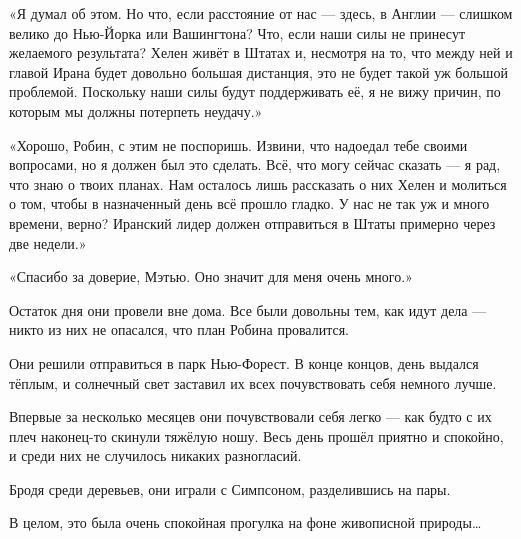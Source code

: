 \documentclass[a4paper,12pt]{book}
\begin{document}
«Я думал об этом. Но что, если расстояние от нас — здесь, в Англии — слишком велико до Нью-Йорка или Вашингтона? Что, если наши силы не принесут желаемого результата? Хелен живёт в Штатах и, несмотря на то, что между ней и главой Ирана будет довольно большая дистанция, это не будет такой уж большой проблемой. Поскольку наши силы будут поддерживать её, я не вижу причин, по которым мы должны потерпеть неудачу.»
\par
«Хорошо, Робин, с этим не поспоришь. Извини, что надоедал тебе своими вопросами, но я должен был это сделать. Всё, что могу сейчас сказать — я рад, что знаю о твоих планах. Нам осталось лишь рассказать о них Хелен и молиться о том, чтобы в назначенный день всё прошло гладко. У нас не так уж и много времени, верно? Иранский лидер должен отправиться в Штаты примерно через две недели.»
\par
«Спасибо за доверие, Мэтью. Оно значит для меня очень много.»\\
\par
Остаток дня они провели вне дома. Все были довольны тем, как идут дела — никто из них не опасался, что план Робина провалится.
\par
Они решили отправиться в парк Нью-Форест. В конце концов, день выдался тёплым, и солнечный свет заставил их всех почувствовать себя немного лучше.
\par
Впервые за несколько месяцев они почувствовали себя легко — как будто с их плеч наконец-то скинули тяжёлую ношу. Весь день прошёл приятно и спокойно, и среди них не случилось никаких разногласий.
\par
Бродя среди деревьев, они играли с Симпсоном, разделившись на пары.
\par
В целом, это была очень спокойная прогулка на фоне живописной природы…
\end{document}
